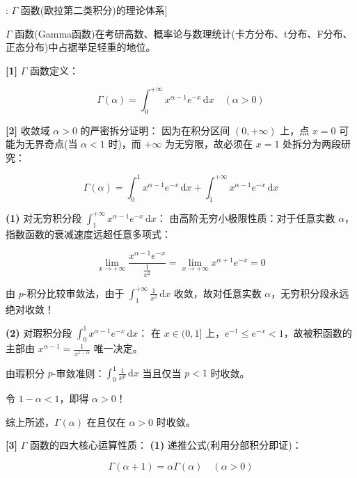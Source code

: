\documentclass[11pt,a4paper,UTF8]{ctexart}
\begin{document}
\begin{thmbox}[函数[1]: $\Gamma$ 函数(欧拉第二类积分)的理论体系]

$\Gamma$ 函数(Gamma函数)在考研高数、概率论与数理统计(卡方分布、t分布、F分布、正态分布)中占据举足轻重的地位。

\textbf{[1]} $\Gamma$ 函数定义：

\begin{equation*}
\Gamma(\alpha) = \int_0^{+\infty} x^{\alpha-1}e^{-x}\,\mathrm{d}x \quad (\alpha > 0)
\end{equation*}


\textbf{[2]} 收敛域 $\alpha > 0$ 的严密拆分证明：
因为在积分区间 $(0, +\infty)$ 上，点 $x=0$ 可能为无界奇点(当 $\alpha < 1$ 时)，而 $+\infty$ 为无穷限，故必须在 $x=1$ 处拆分为两段研究：


\begin{equation*}
\Gamma(\alpha) = \int_0^1 x^{\alpha-1}e^{-x}\,\mathrm{d}x + \int_1^{+\infty} x^{\alpha-1}e^{-x}\,\mathrm{d}x
\end{equation*}


\textbf{(1)}  对无穷积分段 $\int_1^{+\infty} x^{\alpha-1}e^{-x}\,\mathrm{d}x$：
由高阶无穷小极限性质：对于任意实数 $\alpha$，指数函数的衰减速度远超任意多项式：


\begin{equation*}
\lim_{x \to +\infty} \frac{x^{\alpha-1}e^{-x}}{\frac{1}{x^2}} = \lim_{x \to +\infty} x^{\alpha+1}e^{-x} = 0
\end{equation*}


由 $p$-积分比较审敛法，由于 $\int_1^{+\infty} \frac{1}{x^2}\,\mathrm{d}x$ 收敛，故对任意实数 $\alpha$，无穷积分段永远绝对收敛！

\textbf{(2)}  对瑕积分段 $\int_0^1 x^{\alpha-1}e^{-x}\,\mathrm{d}x$：
在 $x \in (0, 1]$ 上，$e^{-1} \leqslant e^{-x} < 1$，故被积函数的主部由 $x^{\alpha-1} = \frac{1}{x^{1-\alpha}}$ 唯一决定。

由瑕积分 $p$-审敛准则：$\int_0^1 \frac{1}{x^p}\,\mathrm{d}x$ 当且仅当 $p < 1$ 时收敛。

令 $1 - \alpha < 1$，即得 $\alpha > 0$！

综上所述，$\Gamma(\alpha)$ 在且仅在 $\alpha > 0$ 时收敛。

\textbf{[3]} $\Gamma$ 函数的四大核心运算性质：
\textbf{(1)}  递推公式(利用分部积分即证)：

\begin{equation*}
\Gamma(\alpha+1) = \alpha\Gamma(\alpha) \quad (\alpha > 0)
\end{equation*}



\end{thmbox}
\end{document}
